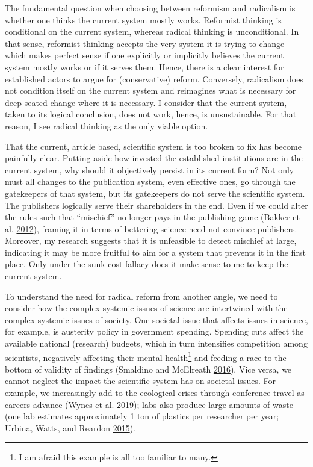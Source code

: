 \documentclass[a5paper]{book}
\let\rmarkdownfootnote\footnote%
\def\footnote{\protect\rmarkdownfootnote}
\begin{document}
The fundamental question when choosing between reformism and radicalism
is whether one thinks the current system mostly works. Reformist
thinking is conditional on the current system, whereas radical thinking
is unconditional. In that sense, reformist thinking accepts the very
system it is trying to change --- which makes perfect sense if one
explicitly or implicitly believes the current system mostly works or if
it serves them. Hence, there is a clear interest for established actors
to argue for (conservative) reform. Conversely, radicalism does not
condition itself on the current system and reimagines what is necessary
for deep-seated change where it is necessary. I consider that the
current system, taken to its logical conclusion, does not work, hence,
is unsustainable. For that reason, I see radical thinking as the only
viable option.

That the current, article based, scientific system is too broken to fix
has become painfully clear. Putting aside how invested the established
institutions are in the current system, why should it objectively
persist in its current form? Not only must all changes to the
publication system, even effective ones, go through the gatekeepers of
that system, but its gatekeepers do not serve the scientific system. The
publishers logically serve their shareholders in the end. Even if we
could alter the rules such that \enquote{mischief} no longer pays in the
publishing game (Bakker et al.
\protect\hyperlink{ref-doi:10.1177ux2f1745691612459060}{2012}), framing
it in terms of bettering science need not convince publishers. Moreover,
my research suggests that it is unfeasible to detect mischief at large,
indicating it may be more fruitful to aim for a system that prevents it
in the first place. Only under the sunk cost fallacy does it make sense
to me to keep the current system.

To understand the need for radical reform from another angle, we need to
consider how the complex systemic issues of science are intertwined with
the complex systemic issues of society. One societal issue that affects
issues in science, for example, is austerity policy in government
spending. Spending cuts affect the available national (research)
budgets, which in turn intensifies competition among scientists,
negatively affecting their mental health\footnote{I am afraid this
  example is all too familiar to many.} and feeding a race to the bottom
of validity of findings (Smaldino and McElreath
\protect\hyperlink{ref-doi:10.1098ux2frsos.160384}{2016}). Vice versa,
we cannot neglect the impact the scientific system has on societal
issues. For example, we increasingly add to the ecological crises
through conference travel as careers advance (Wynes et al.
\protect\hyperlink{ref-doi:10.1016ux2fj.jclepro.2019.04.109}{2019});
labs also produce large amounts of waste (one lab estimates
approximately 1 ton of plastics per researcher per year; Urbina, Watts,
and Reardon \protect\hyperlink{ref-doi:10.1038ux2f528479c}{2015}).
\end{document}
